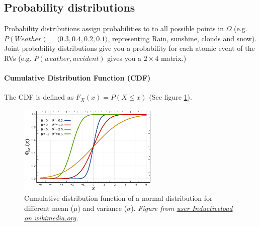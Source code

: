 \documentclass[../main.tex]{subfiles}
\begin{document}
\subsection{Probability distributions} 
Probability distributions assign probabilities to to all possible points in $\Omega$ (e.g. $P(Weather) = \langle 0.3, 0.4, 0.2, 0.1 \rangle$, representing Rain, sunshine, clouds and snow). 
Joint probability distributions give you a probability for each atomic event of the RVs (e.g. $P(weather, accident)$ gives you a $2\times 4$  matrix.)

\paragraph{Cumulative Distribution Function (CDF)}  The CDF is defined as $F_X(x) = P(X \leq x)$ (See figure \ref{CDF}).
        \begin{figure}
            \centering
            \includegraphics[width=0.6\textwidth]{../figures/Normal_Distribution_CDF.png}
            \caption{Cumulative distribution function of a normal distribution for different mean ($\mu$) and variance ($\sigma$). \textit{Figure from \href{https://commons.wikimedia.org/wiki/File:Normal_Distribution_CDF.svg}{user Inductiveload on wikimedia.org}.}}
            \label{CDF}
        \end{figure}
\end{document}
